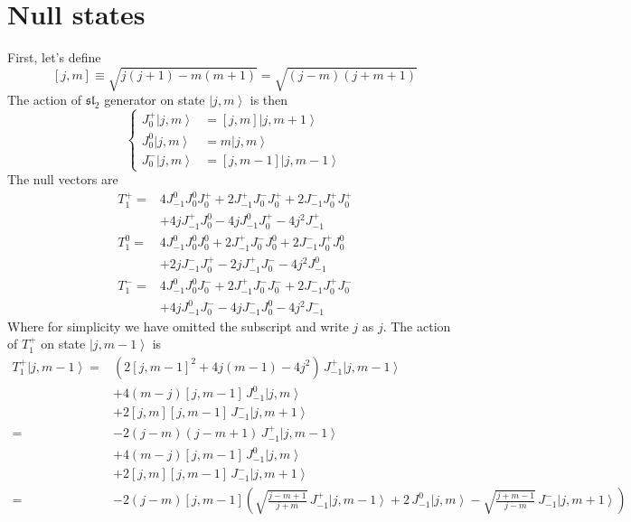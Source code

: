 \documentclass[10pt,a4paper]{article}
\numberwithin{equation}{section}
\newcommand{\ket}[1]{\left| #1 \right\rangle}
\begin{document}
\section{Null states}
First, let's define 
\begin{equation}
    \boxed{
        [j,m] \equiv \sqrt{j(j+1)-m(m+1)} = \sqrt{(j-m)(j+m+1)}
    }
\end{equation}
The action of $\mathfrak{sl}_{2}$ generator on state $\ket{j,m}$ is then 
\begin{equation}
    \left\{
        \begin{aligned}
            J^{+}_{0} \ket{j,m} & = [j,m] \ket{j,m+1}\\
            J^{0}_{0} \ket{j,m} & = m \ket{j,m}\\
            J^{-}_{0} \ket{j,m} & = [j,m-1] \ket{j,m-1}
        \end{aligned}
    \right.
\end{equation}
The null vectors are 
\begin{equation}
    \begin{aligned}
        T^{+}_{1} = & 4 J^{0}_{-1} J^{0}_{0} J^{+}_{0} + 2 J^{+}_{-1} J^{-}_{0} J^{+}_{0} + 2 J^{-}_{-1} J^{+}_{0} J^{+}_{0} \\
        & +4j J^{+}_{-1} J^{0}_{0} -4j J^{0}_{-1} J^{+}_{0} - 4 j^2 J^{+}_{-1}\\
        T^{0}_{1} = & 4 J^{0}_{-1} J^{0}_{0} J^{0}_{0} + 2 J^{+}_{-1} J^{-}_{0} J^{0}_{0} + 2 J^{-}_{-1} J^{+}_{0} J^{0}_{0} \\
        & +2j J^{-}_{-1} J^{+}_{0} -2j J^{+}_{-1} J^{-}_{0} - 4 j^2 J^{0}_{-1}\\
        T^{-}_{1} = & 4 J^{0}_{-1} J^{0}_{0} J^{-}_{0} + 2 J^{+}_{-1} J^{-}_{0} J^{-}_{0} + 2 J^{-}_{-1} J^{+}_{0} J^{-}_{0} \\
        & +4j J^{0}_{-1} J^{-}_{0} -4j J^{-}_{-1} J^{0}_{0} - 4 j^2 J^{-}_{-1}
    \end{aligned}
\end{equation}
Where for simplicity we have omitted the subscript and write $j$ as $j$. The action of $T^{+}_{1}$ on state $\ket{j,m-1}$ is 
\begin{equation}
    \begin{aligned}
        T^{+}_{1} \ket{j,m-1} = & (2[j,m-1]^{2} + 4 j (m-1) - 4 j^{2}) \, J^{+}_{-1}  \ket{j,m-1} \\
        & + 4(m-j) [j,m-1] \, J^{0}_{-1}  \ket{j,m} \\
        & + 2 [j,m] [j,m-1] \, J^{-}_{-1} \ket{j,m+1}\\
        = &  -2(j-m)(j-m+1) \, J^{+}_{-1} \ket{j,m-1} \\
        & + 4(m-j) [j,m-1] \, J^{0}_{-1} \ket{j,m} \\
        & + 2 [j,m] [j,m-1] \, J^{-}_{-1} \ket{j,m+1}\\
        = & -2(j-m) [j,m-1] \left( \sqrt{\frac{j-m+1}{j+m}} \, J^{+}_{-1} \ket{j,m-1} + 2 \, J^{0}_{-1} \ket{j,m} - \sqrt{\frac{j+m-1}{j-m}} \, J^{-}_{-1} \ket{j,m+1}  \right)
    \end{aligned}
\end{equation}
\end{document}
